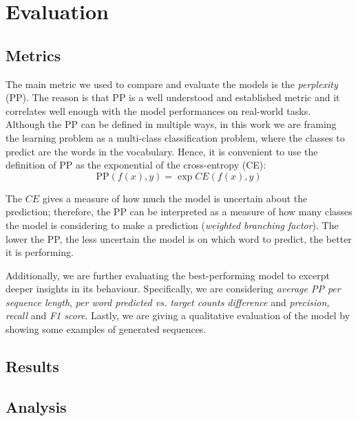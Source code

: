 
\section{Evaluation}
\label{sec:5_eval}
\subsection{Metrics}
The main metric we used to compare and evaluate the models is the \emph{perplexity} (PP). The reason is that PP is a well understood and established metric and it correlates well enough with the model performances on real-world tasks. Although the PP can be defined in multiple ways, in this work we are framing the learning problem as a multi-class classification problem, where the classes to predict are the words in the vocabulary. Hence, it is convenient to use the definition of PP as the exponential of the cross-entropy (CE):
\begin{equation}
    \text{PP}(f(x), y) = \exp{CE(f(x), y)}
\end{equation}

The $CE$ gives a measure of how much the model is uncertain about the prediction; therefore, the PP can be interpreted as a measure of how many classes the model is considering to make a prediction (\emph{weighted branching factor}). The lower the PP, the less uncertain the model is on which word to predict, the better it is performing.

Additionally, we are further evaluating the best-performing model to excerpt deeper insights in its behaviour. Specifically, we are considering \emph{average PP per sequence length}, \emph{per word predicted vs. target counts difference} and \emph{precision, recall} and \emph{F1 score}. Lastly, we are giving a qualitative evaluation of the model by showing some examples of generated sequences.

\subsection{Results}
\subsection{Analysis}